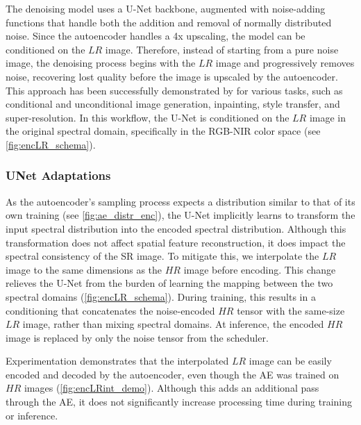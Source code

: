The denoising model uses a U-Net backbone, augmented with noise-adding functions that handle both the addition and removal of normally distributed noise. Since the autoencoder handles a 4x upscaling, the model can be conditioned on the $LR$ image. Therefore, instead of starting from a pure noise image, the denoising process begins with the $LR$ image and progressively removes noise, recovering lost quality before the image is upscaled by the autoencoder. This approach has been successfully demonstrated by \autocite{rombach2022highresolution} for various tasks, such as conditional and unconditional image generation, inpainting, style transfer, and super-resolution. In this workflow, the U-Net is conditioned on the $LR$ image in the original spectral domain, specifically in the RGB-NIR color space (see \autoref{fig:encLR_schema}).

\subsubsection{UNet Adaptations}
As the autoencoder's sampling process expects a distribution similar to that of its own training (see \autoref{fig:ae_distr_enc}), the U-Net implicitly learns to transform the input spectral distribution into the encoded spectral distribution. Although this transformation does not affect spatial feature reconstruction, it does impact the spectral consistency of the SR image. To mitigate this, we interpolate the $LR$ image to the same dimensions as the $HR$ image before encoding. This change relieves the U-Net from the burden of learning the mapping between the two spectral domains (\autoref{fig:encLR_schema}). During training, this results in a conditioning that concatenates the noise-encoded $HR$ tensor with the same-size $LR$ image, rather than mixing spectral domains. At inference, the encoded $HR$ image is replaced by only the noise tensor from the scheduler.

Experimentation demonstrates that the interpolated $LR$ image can be easily encoded and decoded by the autoencoder, even though the AE was trained on $HR$ images (\autoref{fig:encLRint_demo}). Although this adds an additional pass through the AE, it does not significantly increase processing time during training or inference.

